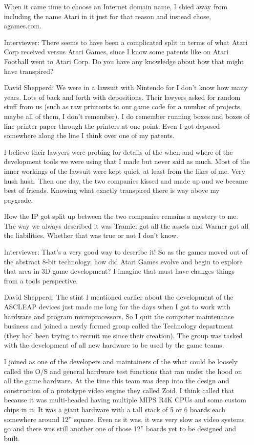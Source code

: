 When it came time to choose an Internet domain name, I shied away from including the name Atari in it just for that reason and instead chose, agames.com. 

\textcolor{interviewer}{Interviewer:} There seems to have been a complicated split in terms of what Atari Corp received versus Atari Games, since I know some patents like on Atari Football went to Atari Corp. Do you have any knowledge about how that might have transpired?

\textcolor{interviewee}{David Shepperd:} We were in a lawsuit with Nintendo for I don't know how many years. Lots of back and forth with depositions. Their lawyers asked for random stuff from us (such as raw printouts to our game code for a number of projects, maybe all of them, I don't remember). I do remember running boxes and boxes of line printer paper through the printers at one point. Even I got deposed somewhere along the line I think over one of my patents. 

I believe their lawyers were probing for details of the when and where of the development tools we were using that I made but never said as much. Most of the inner workings of the lawsuit were kept quiet, at least from the likes of me. Very hush hush. Then one day, the two companies kissed and made up and we became best of friends. Knowing what exactly transpired there is way above my paygrade. 

How the IP got split up between the two companies remains a mystery to me. The way we always described it was Tramiel got all the assets and Warner got all the liabilities. Whether that was true or not I don't know. 

\textcolor{interviewer}{Interviewer:} That’s a very good way to describe it! So as the games moved out of the abstract 8-bit technology, how did Atari Games evolve and begin to explore that area in 3D game development? I imagine that must have changes things from a tools perspective.

\textcolor{interviewee}{David Shepperd:} The stint I mentioned earlier about the development of the ASCLEAP devices just made me long for the days when I got to work with hardware and program microprocessors. So I quit the computer maintenance business and joined a newly formed group called the Technology department (they had been trying to recruit me since their creation). The group was tasked with the development of all new hardware to be used by the game teams. 

I joined as one of the developers and maintainers of the what could be loosely called the O/S and general hardware test functions that ran under the hood on all the game hardware. At the time this team was deep into the design and construction of a prototype video engine they called Zoid. I think called that because it was multi-headed having multiple MIPS R4K CPUs and some custom chips in it. It was a giant hardware with a tall stack of 5 or 6 boards each somewhere around 12” square. Even as it was, it was very slow as video systems go and there was still another one of those 12” boards yet to be designed and built. 

